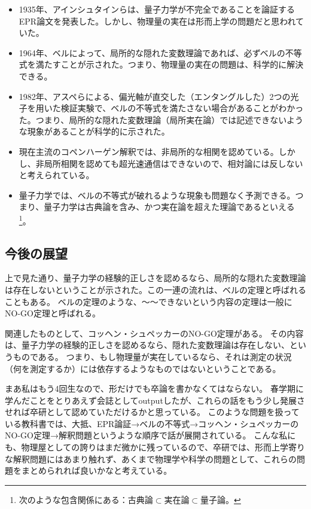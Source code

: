 \documentclass[10pt,b5paper,papersize,dvipdfmx]{jsbook}
\begin{document}
\begin{itemize}
  \item 1935年、アインシュタインらは、量子力学が不完全であることを論証するEPR論文を発表した。しかし、物理量の実在は形而上学の問題だと思われていた。
  \item 1964年、ベルによって、局所的な隠れた変数理論であれば、必ずベルの不等式を満たすことが示された。つまり、物理量の実在の問題は、科学的に解決できる。
  \item 1982年、アスペらによる、偏光軸が直交した（エンタングルした）2つの光子を用いた検証実験で、ベルの不等式を満たさない場合があることがわかった。つまり、局所的な隠れた変数理論（局所実在論）では記述できないような現象があることが科学的に示された。
  \item 現在主流のコペンハーゲン解釈では、非局所的な相関を認めている。しかし、非局所相関を認めても超光速通信はできないので、相対論には反しないと考えられている。
  \item 量子力学では、ベルの不等式が破れるような現象も問題なく予測できる。つまり、量子力学は古典論を含み、かつ実在論を超えた理論であるといえる\footnote{
    次のような包含関係にある：$\text{古典論} \subset \text{実在論} \subset{量子論}。$
  }。
\end{itemize}

%
\subsection{今後の展望}
上で見た通り、量子力学の経験的正しさを認めるなら、局所的な隠れた変数理論は存在しないということが示された。この一連の流れは、ベルの定理と呼ばれることもある。
ベルの定理のような、〜〜できないという内容の定理は一般にNO-GO定理と呼ばれる。\par
関連したものとして、コッヘン・シュペッカーのNO-GO定理がある。
その内容は、量子力学の経験的正しさを認めるなら、隠れた変数理論は存在しない、というものである。
つまり、もし物理量が実在しているなら、それは測定の状況（何を測定するか）には依存するようなものではないということである。
\par
まあ私はもう4回生なので、形だけでも卒論を書かなくてはならない。
春学期に学んだことをとりあえず会誌としてoutputしたが、これらの話をもう少し発展させれば卒研として認めていただけるかと思っている。
このような問題を扱っている教科書では、大抵、EPR論証→ベルの不等式→コッヘン・シュペッカーのNO-GO定理→解釈問題というような順序で話が展開されている。
こんな私にも、物理屋としての誇りはまだ微かに残っているので、卒研では、形而上学寄りな解釈問題にはあまり触れず、あくまで物理学や科学の問題として、これらの問題をまとめられれば良いかなと考えている。\par
\end{document}
